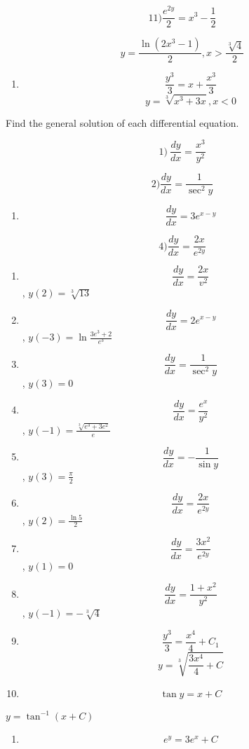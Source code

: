\documentclass[
]{article}
\providecommand{\tightlist}{%
  \setlength{\itemsep}{0pt}\setlength{\parskip}{0pt}}
\begin{document}
\[11) \frac{e^{2y}}{2} = x^3 - \frac{1}{2}\]

\[y = \frac{\ln(2x^3 - 1)}{2}, x > \frac{\sqrt[3]{4}}{2}\]

\begin{enumerate}
\def\labelenumi{\arabic{enumi})}
\setcounter{enumi}{11}
\tightlist
\item
  \[\frac{y^3}{3} = x + \frac{x^3}{3}\]
  \[y = \sqrt[3]{x^3 + 3x}, x < 0\]
\end{enumerate}

Find the general solution of each differential equation.

\[1) \ \frac{dy}{dx} = \frac{x^3}{y^2}\]

\[2) \frac{dy}{dx} = \frac{1}{\sec^2 y}\]

\begin{enumerate}
\def\labelenumi{\arabic{enumi})}
\setcounter{enumi}{2}
\tightlist
\item
  \[\frac{dy}{dx} = 3e^{x-y}\]
\end{enumerate}

\[4) \frac{dy}{dx} = \frac{2x}{e^{2y}}\]

\begin{enumerate}
\def\labelenumi{\arabic{enumi})}
\setcounter{enumi}{4}
\item
  \[\frac{dy}{dx} = \frac{2x}{v^2}\] , \(y(2) = \sqrt[3]{13}\)
\item
  \[\frac{dy}{dx} = 2e^{x-y}\] , \(y(-3) = \ln \frac{3e^3 + 2}{e^3}\)
\item
  \[\frac{dy}{dx} = \frac{1}{\sec^2 y}\] , \(y(3) = 0\)
\item
  \[\frac{dy}{dx} = \frac{e^x}{y^2}\] ,
  \(y(-1) = \frac{\sqrt[3]{e^3 + 3e^2}}{e}\)
\item
  \[\frac{dy}{dx} = -\frac{1}{\sin y}\] , \(y(3) = \frac{\pi}{2}\)
\item
  \[\frac{dy}{dx} = \frac{2x}{e^{2y}}\] , \(y(2) = \frac{\ln 5}{2}\)
\item
  \[\frac{dy}{dx} = \frac{3x^2}{e^{2y}}\] , \(y(1) = 0\)
\item
  \[\frac{dy}{dx} = \frac{1+x^2}{y^2}\] , \(y(-1) = -\sqrt[3]{4}\)
\item
  \[\frac{y^3}{3} = \frac{x^4}{4} + C_1\]
  \[y = \sqrt[3]{\frac{3x^4}{4} + C}\]
\item
  \[\tan y = x + C\]
\end{enumerate}

\(y = \tan^{-1} (x + C)\)

\begin{enumerate}
\def\labelenumi{\arabic{enumi})}
\setcounter{enumi}{2}
\tightlist
\item
  \[e^y = 3e^x + C\]
\end{enumerate}
\end{document}
